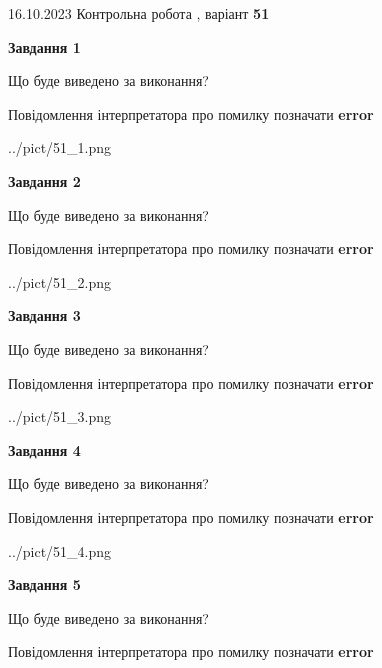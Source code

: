 \documentclass[12pt, ukrainian]{article}
\begin{document}
{\Large{16.10.2023 Контрольна робота , варіант  \No \textbf { 51 }\par}}
{
\begin {large}
{\begin {center}\textbf{Завдання 1}\end {center}}\par
Що буде виведено за виконання? \par
Повідомлення інтерпретатора про помилку позначати \textbf{error}

\begin{center}
	{../pict/51_1.png}
\end{center}
\newpage

{\begin {center}\textbf{Завдання 2}\end {center}}\par
Що буде виведено за виконання? \par
Повідомлення інтерпретатора про помилку позначати \textbf{error}

\begin{center}
	{../pict/51_2.png}
\end{center}
\newpage

{\begin {center}\textbf{Завдання 3}\end {center}}\par
Що буде виведено за виконання? \par
Повідомлення інтерпретатора про помилку позначати \textbf{error}

\begin{center}
	{../pict/51_3.png}
\end{center}
\newpage

{\begin {center}\textbf{Завдання 4}\end {center}}\par
Що буде виведено за виконання? \par
Повідомлення інтерпретатора про помилку позначати \textbf{error}

\begin{center}
	{../pict/51_4.png}
\end{center}
\newpage

{\begin {center}\textbf{Завдання 5}\end {center}}\par
Що буде виведено за виконання? \par
Повідомлення інтерпретатора про помилку позначати \textbf{error}


\end{large}}
\end{document}
